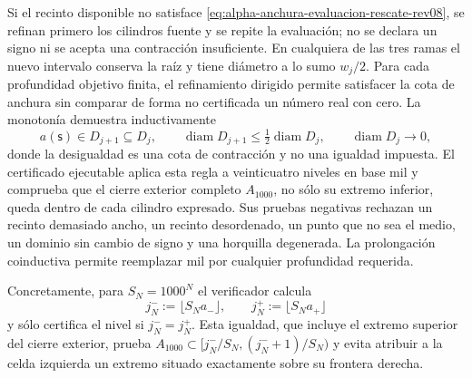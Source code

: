 Si el recinto disponible no satisface
\eqref{eq:alpha-anchura-evaluacion-rescate-rev08}, se refinan primero los
cilindros fuente y se repite la evaluación; no se declara un signo ni se
acepta una contracción insuficiente. En cualquiera de las tres ramas el nuevo
intervalo conserva la raíz y tiene diámetro a lo sumo \(w_j/2\). Para cada
profundidad objetivo finita, el refinamiento dirigido permite satisfacer la
cota de anchura sin comparar de forma no certificada un número real con cero.
La monotonía demuestra inductivamente
\begin{equation}
 a(\mathsf s)\in D_{j+1}\subseteq D_j,\qquad
 \operatorname{diam}D_{j+1}\leq
 \tfrac12\operatorname{diam}D_j,
 \qquad \operatorname{diam}D_j\longrightarrow0,
 \label{eq:alpha-biseccion-racional}
\end{equation}
donde la desigualdad es una cota de contracción y no una igualdad impuesta.
El certificado ejecutable aplica
esta regla a veinticuatro niveles en base mil y comprueba que el cierre
exterior completo \(A_{1000}\), no sólo su extremo inferior, queda dentro de
cada cilindro expresado. Sus pruebas negativas rechazan un recinto demasiado
ancho, un recinto desordenado, un punto que no sea el medio, un dominio sin
cambio de signo y una horquilla degenerada. La prolongación coinductiva permite
reemplazar mil por cualquier profundidad requerida.

Concretamente, para \(S_N=1000^N\) el verificador calcula
\begin{equation}
 j_N^-:=\lfloor S_Na_-\rfloor,
 \qquad j_N^+:=\lfloor S_Na_+\rfloor
 \label{eq:alpha-indices-cilindro-dirigidos-rev08}
\end{equation}
y sólo certifica el nivel si \(j_N^-=j_N^+\). Esta igualdad, que incluye el
extremo superior del cierre exterior, prueba
\(A_{1000}\subset[j_N^-/S_N,(j_N^-+1)/S_N)\) y evita atribuir a la celda
izquierda un extremo situado exactamente sobre su frontera derecha.

